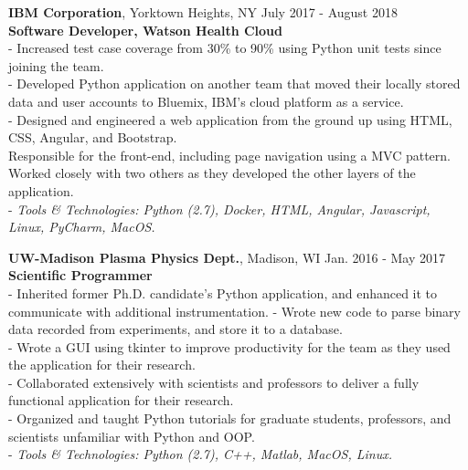 \documentclass{resume}
\begin{document}
\begin{flushleft}
\textbf{IBM Corporation}, Yorktown Heights, NY \hfill July 2017 - August 2018\\
\textbf{Software Developer, Watson Health Cloud}\\
{\footnotesize
	\ttab- Increased test case coverage from 30\% to 90\% using Python unit tests since joining the team. \\
	\ttab- Developed Python application on another team that moved their locally stored data and user accounts to Bluemix,
	\ttab IBM's cloud platform as a service. \\
	\ttab- Designed and engineered a web application from the ground up using HTML, CSS, Angular, and Bootstrap. \\
	\ttab Responsible for the front-end, including page navigation using a MVC pattern.  Worked closely with two others as they
	\ttab developed the other layers of the application. \\
	\ttab- \textit{Tools \& Technologies: Python (2.7), Docker, HTML, Angular, Javascript, Linux, PyCharm, MacOS.}\\[3mm]
}

\textbf{UW-Madison Plasma Physics Dept.}, Madison, WI \hfill Jan. 2016 - May 2017 \\
\textbf{Scientific Programmer}\\
{\footnotesize
	\ttab- Inherited former Ph.D. candidate's Python application, and enhanced it to communicate with additional instrumentation.
	\ttab- Wrote new code to parse binary data recorded from experiments, and store it to a database. \\
	\ttab- Wrote a GUI using tkinter to improve productivity for the team as they used the application for their research. \\
	\ttab- Collaborated extensively with scientists and professors to deliver a fully functional application for their research. \\
	\ttab- Organized and taught Python tutorials for graduate students, professors, and scientists unfamiliar with Python and OOP. \\
	\ttab- \textit{Tools \& Technologies: Python (2.7), C++,  Matlab, MacOS, Linux.}\\[5mm]
}


\end{flushleft}
\end{document}
